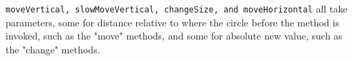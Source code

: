 \verb|moveVertical, slowMoveVertical, changeSize, and moveHorizontal|
all take parameters, some for distance relative to where the circle
before the method is invoked, such as the "move" methods, and some for
absolute new value, such as the "change" methods.
